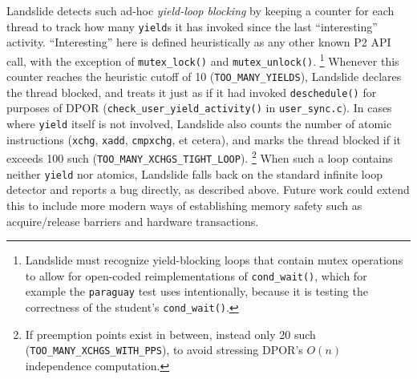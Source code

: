 Landslide detects such ad-hoc {\em yield-loop blocking}
by keeping a counter for each thread to track how many {\tt yield}s it has invoked since the last ``interesting'' activity.
``Interesting'' here is defined heuristically as any other known P2 API call,
with the exception of {\tt mutex\_lock()} and {\tt mutex\_unlock()}.%
\footnote{Landslide must recognize yield-blocking loops that contain mutex operations
to allow for open-coded reimplementations of {\tt cond\_wait()},
which for example the {\tt paraguay} test uses intentionally,
because it is testing the correctness of the student's {\tt cond\_wait()}.}
Whenever this counter reaches the heuristic cutoff of 10 ({\tt TOO\_MANY\_YIELDS}),
Landslide declares the thread blocked,
and treats it just as if it had invoked {\tt deschedule()} for purposes of DPOR
({\tt check\_user\_yield\_activity()} in {\tt user\_sync.c}).
%
In cases where {\tt yield} itself is not involved,
Landslide also counts the number of atomic instructions ({\tt xchg}, {\tt xadd}, {\tt cmpxchg}, et cetera),
and marks the thread blocked if it exceeds 100 such ({\tt TOO\_MANY\_XCHGS\_TIGHT\_LOOP}).%
\footnote{If preemption points exist in between, instead only 20 such ({\tt TOO\_MANY\_XCHGS\_WITH\_PPS}),
to avoid stressing DPOR's $O(n)$ independence computation.}
When such a loop contains neither {\tt yield} nor atomics,
Landslide falls back on the standard infinite loop detector and reports a bug directly, as described above.
Future work could extend this to include more modern ways of establishing memory safety such as
acquire/release barriers
and hardware transactions.

